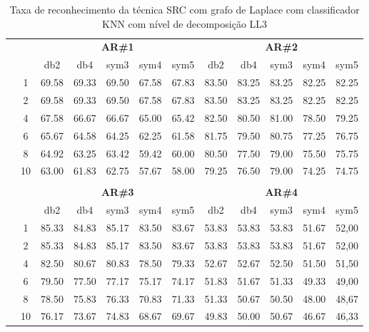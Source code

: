 \begin{table}[htpb]
\end{table}




\begin{table}[htpb]
	\centering
    \normalsize
	\caption{Taxa de reconhecimento da técnica SRC com grafo de Laplace com classificador KNN com nível de decomposição LL3}
	\begin{tabular}{|c|c|c c c c c|c c c c c|}
\cline{3-12}
\multicolumn{2}{c|}{\multirow{2}{*}{}} & \multicolumn{5}{c|}{\textbf{AR\#1}}  & \multicolumn{5}{c|}{\textbf{AR\#2}} \\\cline{3-12}

\multicolumn{2}{c|}{}  & db2 & db4 & sym3 & sym4 & sym5 & db2 & db4& sym3 & sym4 & sym5 \\\hline

\multicolumn{1}{|c|}{ \multirow{5}{*}{\rotatebox[origin=c]{90}{\textbf{K-vizinhos}}} }
&1	& 69.58&	69.33&	69.50&	67.58&	67.83&	83.50&	83.25&	83.25&	82.25&	82.25	\\\cline{2-12}
&2	& 69.58&	69.33&	69.50&	67.58&	67.83&	83.50&	83.25&	83.25&	82.25&	82.25	\\\cline{2-12}
&4	& 67.58&	66.67&	66.67&	65.00&	65.42&	82.50&	80.50&	81.00&	78.50&	79.25	\\\cline{2-12}
&6	& 65.67&	64.58&	64.25&	62.25&	61.58&	81.75&	79.50&	80.75&	77.25&	76.75	\\\cline{2-12}
&8	& 64.92&	63.25&	63.42&	59.42&	60.00&	80.50&	77.50&	79.00&	75.50&	75.75	\\\cline{2-12}
&10	& 63.00&	61.83&	62.75&	57.67&	58.00&	79.25&	76.50&	79.00&	74.25&	74.75   \\ \midrule
\multicolumn{12}{c}{}\\ 




\cline{3-12}
\multicolumn{2}{c}{} & \multicolumn{5}{|c|}{\textbf{AR\#3}}  & \multicolumn{5}{c|}{\textbf{AR\#4}} \\\cline{3-12}
\multicolumn{2}{c}{}  & \multicolumn{1}{|c}{db2} & db4 & sym3 & sym4 & sym5 & db2 & db4& sym3 & sym4 & sym5 \\\hline
\multicolumn{1}{|c|}{ \multirow{6}{*}{\rotatebox[origin=c]{90}{\textbf{K-vizinhos}}} }
&1	&85.33&	84.83&	85.17&	83.50&	83.67&	53.83&	53.83&	53.83&	51.67	&52,00	\\\cline{2-12}
&2	&85.33&	84.83&	85.17&	83.50&	83.67&	53.83&	53.83&	53.83&	51.67	&52,00	\\\cline{2-12}
&4	&82.50&	80.67&	80.83&	78.50&	79.33&	52.67&	52.67&	52.50&	51.50	&51,50	\\\cline{2-12}
&6	&79.50&	77.50&	77.17&	75.17&	74.17&	51.83&	51.67&	51.33&	49.33	&49,00	\\\cline{2-12}
&8	&78.50&	75.83&	76.33&	70.83&	71.33&	51.33&	50.67&	50.50&	48.00	&48,67	\\\cline{2-12}
&10	&76.17&	73.67&	74.83&	68.67&	69.67&	49.83&	50.00&	50.67&	46.67	&46,33	\\\midrule
\end{tabular}

\end{table}




